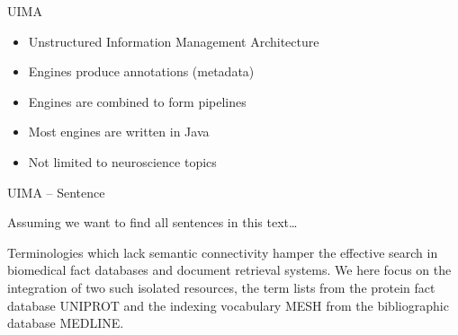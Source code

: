 \documentclass[10pt, compress, xcolor={usenames,dvipsnames}]{beamer}
\newcommand{\SmallArrow}{\ding{228}}
\newcommand{\BigArrow}{$\Longrightarrow$} %
\renewcommand{\emph}[1]{\alert{#1}}
\begin{document}




\begin{frame}[fragile]{UIMA}

  \begin{itemize}[label=\SmallArrow, itemsep=1em]

    \item Unstructured Information Management Architecture

    \item \emph{Engines} produce \emph{annotations} (metadata)

    \item Engines are combined to form \emph{pipelines}

    \item Most engines are written in Java

    \item Not limited to neuroscience topics

  \end{itemize}

\end{frame}

\begin{frame}[fragile]{UIMA -- Sentence}

  Assuming we want to find all sentences in this text\ldots

  \vspace{1em}

  \begin{myquote}
    Terminologies which lack semantic connectivity hamper the effective search
    in biomedical fact databases and document retrieval systems. We here focus
    on the integration of two such isolated resources, the term lists from the
    protein fact database UNIPROT and the indexing vocabulary MESH from the
    bibliographic database MEDLINE.
  \end{myquote}

\end{frame}

%
%
%
%
\end{document}
